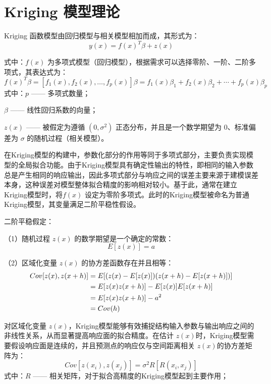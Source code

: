 \section{Kriging 模型理论}
Kriging 函数模型由回归模型与相关模型相加而成，其形式为\cite{JTKJ201904016}：
\begin{equation}
    y(x) = f(x)^T \beta + z(x)
    \label{eq:2.1}
\end{equation}

式中：\( f(x) \) 为多项式模型（回归模型），根据需求可以选择零阶、一阶、二阶多项式，其表达式为：
\begin{equation}
    f(x)^T \beta = [f_1(x), f_2(x), \ldots, f_p(x)] \beta = f_1(x) \beta_1 + f_2(x) \beta_2 + \cdots + f_p(x) \beta_p
    \label{eq:2.2}
\end{equation}
式中：\( p \) —— 多项式数量；

\quad\( \beta \) —— 线性回归系数的向量；

\quad\( z(x) \) —— 被假定为遵循 \( (0, \sigma^2) \) 正态分布，并且是一个数学期望为 0、标准偏差为 \( \sigma \) 的随机过程（相关模型）。

在Kriging模型的构建中，参数化部分的作用等同于多项式部分，主要负责实现模型的全局拟合功能。由于Kriging模型具有确定性输出的特性，即相同的输入参数总是产生相同的响应输出，因此多项式部分与响应之间的误差主要来源于建模误差本身，这种误差对模型整体拟合精度的影响相对较小。基于此，通常在建立Kriging模型时，将\( f(x) \) 设定为零阶多项式。此时的Kriging模型被命名为普通Kriging模型，其变量满足二阶平稳性假设。

二阶平稳假定：

（1）随机过程 \( z(x) \) 的数学期望是一个确定的常数：
\begin{equation}
    E[z(x)] = a
    \label{eq:2.3}
\end{equation}

（2）区域化变量 \( z(x) \) 的协方差函数存在并且相等：
\begin{align}
    Cov[z(x), z(x+h)] &= E[(z(x) - E[z(x)])(z(x+h) - E[z(x+h)])] \notag \\
    &= E[z(x)z(x+h)] - E[z(x)]E[z(x+h)] \notag \\
    &= E[z(x)z(x+h)] - a^2 \notag \\
    &= Cov(h)
    \label{eq:2.4}
\end{align}

对区域化变量 \( z(x) \)，Kriging模型能够有效捕捉结构输入参数与输出响应之间的非线性关系，从而显著提高响应面的拟合精度。在估计 \( z(x) \)时，Kriging模型需要假设响应面是连续的，并且预测点的响应仅与空间距离相关 \( z(x) \)的协方差矩阵为：
\begin{equation}
    Cov[z(x_i), z(x_j)] = \sigma^2 R[R(x_i, x_j)]
    \label{eq:2.5}
\end{equation}
式中：\( R \) —— 相关矩阵，对于拟合高精度的Kriging模型起到主要作用； 

